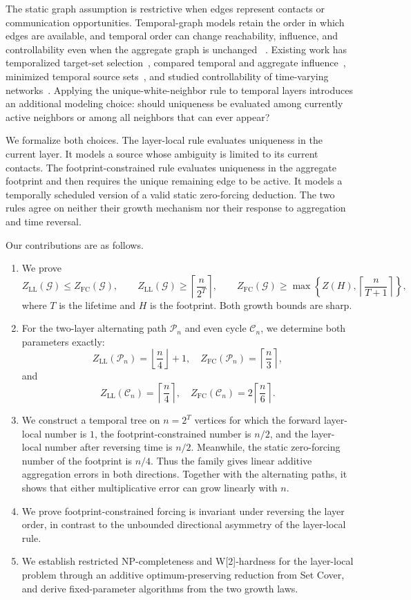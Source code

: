\documentclass[11pt]{article}
\theoremstyle{definition}
\theoremstyle{remark}
\newcommand{\calG}{\mathcal{G}}
\newcommand{\calP}{\mathcal{P}}
\newcommand{\calC}{\mathcal{C}}
\newcommand{\LL}{\mathrm{LL}}
\newcommand{\FC}{\mathrm{FC}}
\begin{document}
The static graph assumption is restrictive when edges represent contacts or
communication opportunities.  Temporal-graph models retain the order in
which edges are available, and temporal order can change reachability,
influence, and controllability even when the aggregate graph is unchanged
~\cite{casteigts2012}.
Existing work has temporalized target-set selection~\cite{schierreich2023},
compared temporal and aggregate influence~\cite{michalski2014}, minimized
temporal source sets~\cite{yadav2026}, and studied controllability of
time-varying networks~\cite{srighakollapu2022,mousavi2021,yao2017}.
Applying the unique-white-neighbor rule to temporal layers introduces an
additional modeling choice: should
uniqueness be evaluated among currently active neighbors or among all
neighbors that can ever appear?

We formalize both choices.  The layer-local rule evaluates uniqueness in the
current layer.  It models a source whose ambiguity is limited to its current
contacts.  The footprint-constrained rule evaluates uniqueness in the
aggregate footprint and then requires the unique remaining edge to be active.
It models a temporally scheduled version of a valid static zero-forcing
deduction.  The two rules agree on neither their growth mechanism nor their
response to aggregation and time reversal.

Our contributions are as follows.

\begin{enumerate}[leftmargin=*]
  \item We prove
  \[
    Z_{\LL}(\calG)\le Z_{\FC}(\calG),\qquad
    Z_{\LL}(\calG)\ge \left\lceil\frac{n}{2^T}\right\rceil,
    \qquad
    Z_{\FC}(\calG)\ge
    \max\left\{Z(H),\left\lceil\frac{n}{T+1}\right\rceil\right\},
  \]
  where $T$ is the lifetime and $H$ is the footprint.  Both growth bounds
  are sharp.
  \item For the two-layer alternating path $\calP_n$ and even cycle
  $\calC_n$, we determine both parameters exactly:
  \[
  Z_{\LL}(\calP_n)=\left\lfloor\frac n4\right\rfloor+1,
  \quad Z_{\FC}(\calP_n)=\left\lceil\frac n3\right\rceil,
  \]
  and
  \[
  Z_{\LL}(\calC_n)=\left\lceil\frac n4\right\rceil,
  \quad Z_{\FC}(\calC_n)=2\left\lceil\frac n6\right\rceil.
  \]
  \item We construct a temporal tree on $n=2^T$ vertices for which the
  forward layer-local number is $1$, the footprint-constrained number is
  $n/2$, and the layer-local number after reversing time is $n/2$.
  Meanwhile, the static zero-forcing number of the footprint is $n/4$.
  Thus the family gives linear additive aggregation errors in both
  directions.  Together with the alternating paths, it shows that either
  multiplicative error can grow linearly with $n$.
  \item We prove footprint-constrained forcing is invariant under reversing
  the layer order, in contrast to the unbounded directional asymmetry of the
  layer-local rule.
  \item We establish restricted NP-completeness and W[2]-hardness for the
  layer-local problem through an additive optimum-preserving reduction from Set
  Cover, and derive fixed-parameter algorithms from the two growth laws.
\end{enumerate}
\end{document}
